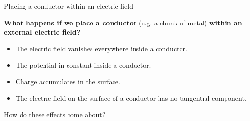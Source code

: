%
%
%

\begin{frame}{Placing a conductor within an electric field}

{\bf What happens if we place a conductor} (e.g. a chunk of metal)
{\bf within an external electric field?}\\
\vspace{0.3cm}

\begin{itemize}
  \item The electric field vanishes everywhere inside a conductor.
  \item The potential in constant inside a conductor.
  \item Charge accumulates in the surface.
  \item The electric field on the surface of a conductor has no tangential component.
\end{itemize}

\vspace{0.2cm}
How do these effects come about?

\end{frame}


%
%
%

